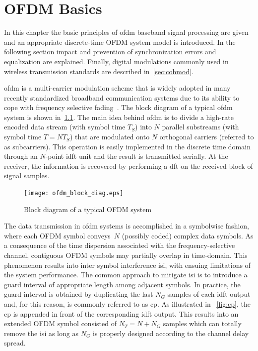 \chapter{OFDM Basics}\label{sec:basic}

In this chapter the basic principles of \gls{ofdm} baseband signal processing are given and an appropriate discrete-time OFDM system model is introduced. In the following section impact and prevention of synchronization errors and equalization are explained. Finally, digital modulations commonly used in wireless transmission standards are described in~\cref{sec:cohmod}.

\gls{ofdm} is a multi-carrier modulation scheme that is widely adopted in many recently standardized broadband communication systems due to its ability to cope with frequency selective fading~\cite{MCMorelli}. The block diagram of a typical \gls{ofdm} system is shown in~\cref{fig:block_diagram}. The main idea behind \gls{ofdm} is to divide a high-rate encoded data stream (with symbol time $T_S$) into $N$ parallel substreams (with symbol time $T = NT_S$) that are modulated onto $N$ orthogonal carriers (referred to as subcarriers). This operation is easily implemented in the discrete time domain through an $N$-point \gls{idft} unit and the result is transmitted serially. At the receiver, the information is recovered by performing a \gls{dft} on the received block of signal samples.
%
\begin{figure}[thb]
\centering
\texttt{[image: ofdm\_block\_diag.eps]}
\caption{Block diagram of a typical OFDM system\label{fig:block_diagram}}
\end{figure}
%
%
The data transmission in \gls{ofdm} systems is accomplished in a symbolwise fashion, where each OFDM symbol conveys~$N$ (possibly coded) complex data symbols. As a consequence of the time dispersion associated with the frequency-selective channel, contiguous OFDM symbols may partially overlap in time-domain. This phenomenon results into inter symbol interference \gls{isi}, with ensuing limitations of the system performance. The common approach to mitigate \gls{isi} is to introduce a guard interval of appropriate length among adjacent symbols. In practice, the guard interval is obtained by duplicating the last $N_G$ samples of each \gls{idft} output and, for this reason, is commonly referred to as \gls{cp}. As illustrated in ~\cref{fig:cp}, the \gls{cp} is appended in front of the corresponding \gls{idft} output. This results into an extended OFDM symbol consisted of $N_T = N + N_G$ samples which can totally remove the \gls{isi} as long as $N_G$ is properly designed according to the channel delay spread.

